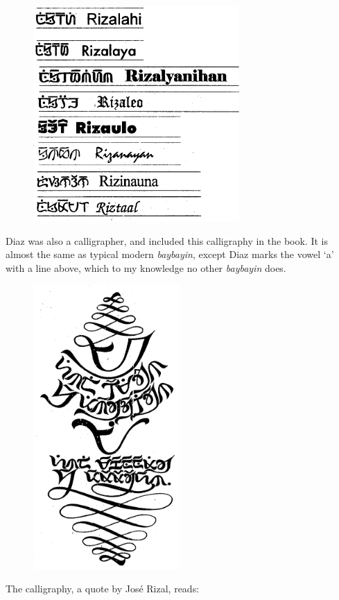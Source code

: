 \documentclass[a4paper,pagesize,openany,14pt,parskip=never]{scrbook}
\newcommand{\≈}{$\approx$}
\begin{document}
\begin{figure}[H]
\includegraphics[width=0.7\textwidth]{Rizal-fontsF}
\end{figure}
\newpage
\label{RizaleoC}
Diaz was also a calligrapher, and included this calligraphy in the book. It is almost the same as typical modern {\em baybayin}, except Diaz marks the vowel `a' with a line above, which to my knowledge no other {\em baybayin} does.

\begin{figure}[H]
\includegraphics[width=0.5\textwidth]{ARCalligraphy}
\end{figure}
The calligraphy, a quote by Jos\'e Rizal, reads:
\end{document}
